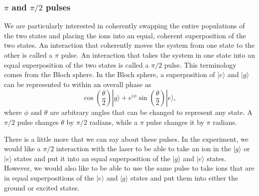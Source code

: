 \subsubsection{$\pi$ and $\pi/2$ pulses}
We are particularly interested in coherently swapping the entire populations of the two states and placing the ions into an equal, coherent superposition of the two states.
An interaction that coherently moves the system from one state to the other is called a $\pi$ pulse. An interaction that takes the system in one state into an equal superposition of the two states is called a $\pi/2$ pulse. This terminology comes from the Bloch sphere. In the Bloch sphere, a superposition of $|e\rangle$ and $|g\rangle$ can be represented to within an overall phase as 
\begin{equation}
\cos\left(\frac{\theta}{2}\right)|g\rangle+
e^{i\phi}\sin\left(\frac{\theta}{2}\right)|e\rangle,
\end{equation}
where $\phi$ and $\theta$ are arbitrary angles that can be changed to represent any state. A $\pi/2$ pulse changes $\theta$ by $\pi/2$ radians, while a $\pi$ pulse changes it by $\pi$ radians.

There is a little more that we can say about these pulses. In the experiment, we would like a $\pi/2$ interaction with the laser to be able to take an ion in the $|g\rangle$ or $|e\rangle$ states and put it into an equal superposition of the $|g\rangle$ and $|e\rangle$ states. However, we would also like to be able to use the same pulse to take ions that are in equal superpositions of the $|e\rangle$ and $|g\rangle$ states and put them into either the ground or excited states.

